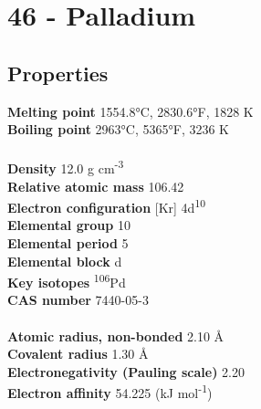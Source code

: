 \section{46 - Palladium}
\label{sec:elem-palladium}
\subsection{Properties}
\textbf{Melting point} 1554.8°C, 2830.6°F, 1828 K\\
\textbf{Boiling point} 2963°C, 5365°F, 3236 K\\
\\
\textbf{Density} 12.0 g cm\textsuperscript{-3}\\
\textbf{Relative atomic mass} 106.42\\
\textbf{Electron configuration} [Kr] 4d\textsuperscript{10}\\
\textbf{Elemental group} 10\\
\textbf{Elemental period} 5\\
\textbf{Elemental block} d\\
\textbf{Key isotopes} \textsuperscript{106}Pd\\
\textbf{CAS number} 7440-05-3\\
\\
\textbf{Atomic radius, non-bonded} 2.10 Å\\
\textbf{Covalent radius} 1.30 Å\\
\textbf{Electronegativity (Pauling scale)} 2.20\\
\textbf{Electron affinity} 54.225 (kJ mol\textsuperscript{-1})\\